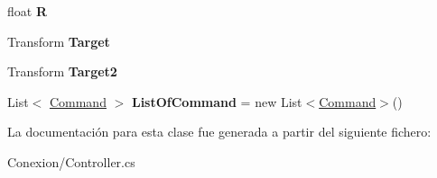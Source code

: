 \begin{DoxyCompactItemize}
\mbox{\label{class_controller_a9a81cea56c40bb6170c9d01b1a21b019}} 
float {\bfseries R}
\item 
\mbox{\label{class_controller_afcc92593ba6bdc37792a82f7c40f0f95}} 
Transform {\bfseries Target}
\item 
\mbox{\label{class_controller_ad3e4c3c8afaaa49d3c534050c63d47b1}} 
Transform {\bfseries Target2}
\item 
\mbox{\label{class_controller_ad900dbfae2bb9097caa6aeba1636030c}} 
List$<$ \mbox{\hyperlink{struct_controller_1_1_command}{Command}} $>$ {\bfseries List\+Of\+Command} = new List$<$\mbox{\hyperlink{struct_controller_1_1_command}{Command}}$>$()
\end{DoxyCompactItemize}


La documentación para esta clase fue generada a partir del siguiente fichero\+:\begin{DoxyCompactItemize}
\item 
Conexion/Controller.\+cs\end{DoxyCompactItemize}
